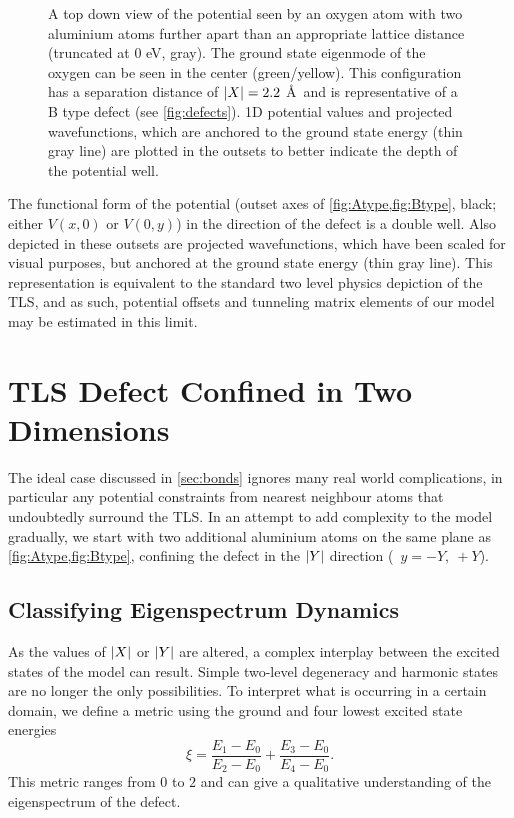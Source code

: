 \begin{figure}[htp]
\caption[fig4]{\label{fig:Btype}A top down view of the potential seen by an oxygen atom with two aluminium atoms further apart than an appropriate lattice distance (truncated at $0$ eV, gray). The ground state eigenmode of the oxygen can be seen in the center (green/yellow). This configuration has a separation distance of $\lvert X\rvert = 2.2$ \AA\ and is representative of a B type defect (see \cref{fig:defects}).  1D potential values and projected wavefunctions, which are anchored to the ground state energy (thin gray line) are plotted in the outsets to better indicate the depth of the potential well.}
\end{figure}

The functional form of the  potential (outset axes of \cref{fig:Atype,fig:Btype}, black; either $V(x,0)$ or $V(0,y)$) in the direction of the defect is a double well.
Also depicted in these outsets are projected wavefunctions, which have been scaled for visual purposes, but anchored at the ground state energy (thin gray line).
This representation is equivalent to the standard two level physics depiction of the TLS, and as such, potential offsets and tunneling matrix elements of our model may be estimated in this limit.

\section{TLS Defect Confined in Two Dimensions}\label{sec:2d}

The ideal case discussed in \cref{sec:bonds} ignores many real world complications, in particular any potential constraints from nearest neighbour atoms that undoubtedly surround the TLS.
In an attempt to add complexity to the model gradually, we start with two additional aluminium atoms on the same plane as \cref{fig:Atype,fig:Btype}, confining the defect in the $\lvert Y\rvert$ direction (\ie\ $y = -Y, \: +Y$).

\subsection{Classifying Eigenspectrum Dynamics}

As the values of $\lvert X\rvert$ or $\lvert Y\rvert$ are altered, a complex interplay between the excited states of the model can result.
Simple two-level degeneracy and harmonic states are no longer the only possibilities. To interpret what is occurring in a certain domain, we define a metric using the ground and four lowest excited state energies
\begin{equation}
\xi=\frac{E_{1}-E_{0}}{E_{2}-E_{0}}+\frac{E_{3}-E_{0}}{E_{4}-E_{0}}.
\end{equation}
This metric ranges from $0$ to $2$ and can give a qualitative understanding of the eigenspectrum of the defect.


